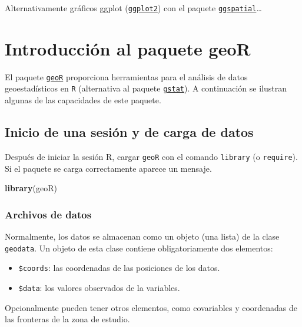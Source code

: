 \documentclass[
]{book}
\newenvironment{Shaded}{\begin{snugshade}}{\end{snugshade}}
\newcommand{\FunctionTok}[1]{\textcolor[rgb]{0.13,0.29,0.53}{\textbf{#1}}}
\newcommand{\NormalTok}[1]{#1}
\theoremstyle{break}
\theoremstyle{definition}
\theoremstyle{definition}
\theoremstyle{definition}
\theoremstyle{definition}
\theoremstyle{remark}
\begin{document}
Alternativamente gráficos ggplot (\href{https://ggplot2.tidyverse.org}{\texttt{ggplot2}}) con el paquete \href{https://paleolimbot.github.io/ggspatial}{\texttt{ggspatial}}\ldots{}

\chapter{\texorpdfstring{Introducción al paquete \textbf{geoR}}{Introducción al paquete geoR}}\label{intro-geoR}

El paquete \href{http://www.leg.ufpr.br/geoR}{\texttt{geoR}} proporciona herramientas para el análisis de datos
geoestadísticos en \texttt{R}
(alternativa al paquete \href{http://r-spatial.github.io/gstat}{\texttt{gstat}}).
A continuación se ilustran algunas de las capacidades de este paquete.

\section{Inicio de una sesión y de carga de datos}\label{inicio-de-una-sesiuxf3n-y-de-carga-de-datos}

Después de iniciar la sesión R, cargar \texttt{geoR} con el comando \texttt{library} (o
\texttt{require}). Si el paquete se carga correctamente aparece un mensaje.

\begin{Shaded}
\begin{Highlighting}[]
\FunctionTok{library}\NormalTok{(geoR)}
\end{Highlighting}
\end{Shaded}

\subsection{Archivos de datos}\label{archivos-de-datos}

Normalmente, los datos se almacenan como un objeto (una lista) de la
clase \texttt{geodata}. Un objeto de esta clase contiene obligatoriamente dos
elementos:

\begin{itemize}
\item
  \texttt{\$coords}: las coordenadas de las posiciones de los datos.
\item
  \texttt{\$data}: los valores observados de la variables.
\end{itemize}

Opcionalmente pueden tener otros elementos, como covariables
y coordenadas de las fronteras de la zona de estudio.
\end{document}
